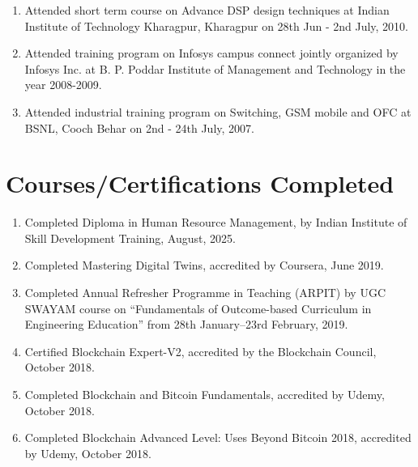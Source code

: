 \documentclass[11pt,a4paper]{moderncv}
\begin{document}
\begin{adjustwidth}{6em}{0pt}
\begin{enumerate}
		\item Attended short term course on Advance DSP design techniques at Indian Institute of Technology Kharagpur, Kharagpur on 28th Jun - 2nd July, 2010.
		
		\item Attended training program on Infosys campus connect jointly organized by Infosys Inc. at B. P. Poddar Institute of Management and Technology in the year 2008-2009.
		
		\item Attended industrial training program on Switching, GSM mobile and OFC at BSNL, Cooch Behar on 2nd - 24th July, 2007.
		
	\end{enumerate}
\end{adjustwidth}



\section{\textbf{Courses/Certifications Completed}}

\begin{adjustwidth}{6em}{0pt}
	\begin{enumerate}
		
		\item Completed Diploma in Human Resource Management, by Indian Institute of Skill Development Training, August, 2025.
		
		\item Completed Mastering Digital Twins, accredited by Coursera, June 2019.
		
		\item Completed Annual Refresher Programme in Teaching (ARPIT) by UGC SWAYAM course on “Fundamentals of Outcome-based Curriculum in Engineering Education” from 28th January–23rd February, 2019.
		
		\item Certified Blockchain Expert-V2, accredited by the Blockchain Council, October 2018.
		
		\item Completed Blockchain and Bitcoin Fundamentals, accredited by Udemy, October 2018.
		
		\item Completed Blockchain Advanced Level: Uses Beyond Bitcoin 2018, accredited by Udemy, October 2018.
		
	\end{enumerate}
\end{adjustwidth}
\end{document}

